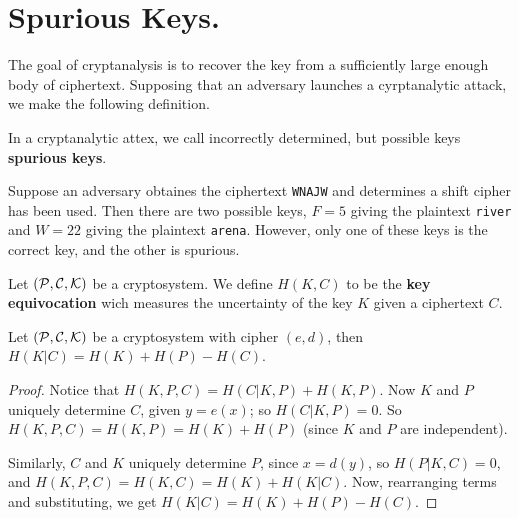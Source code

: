
\section{Spurious Keys.}
\label{section1}

The goal of cryptanalysis is to recover the key from a sufficiently large enough
body of ciphertext. Supposing that an adversary launches a cyrptanalytic attack,
we make the following definition.

\begin{definition}
    In a cryptanalytic attex, we call incorrectly determined, but possible keys
     \textbf{spurious keys}.
\end{definition}

\begin{example}
    Suppose an adversary obtaines the ciphertext \lstinline{WNAJW} and
    determines a shift cipher has been used. Then there are two possible keys,
    $F=5$ giving the plaintext \lstinline {river} and $W=22$ giving the
    plaintext \lstinline{arena}. However, only one of these keys is the correct
    key, and the other is spurious.
\end{example}

\begin{definition}
    Let $(\mathcal{P},\mathcal{C},\mathcal{K})$ be a cryptosystem. We define $H(K,C)$ to be the
    \textbf{key equivocation} wich measures the uncertainty of the key $K$ given
    a ciphertext $C$.
\end{definition}

\begin{theorem}\label{2.3.1}
    Let $(\mathcal{P},\mathcal{C},\mathcal{K})$ be a cryptosystem with cipher $(e,d)$, then
    $H(K|C)=H(K)+H(P)-H(C)$.
\end{theorem}
\begin{proof}
    Notice that $H(K,P,C)=H(C|K,P)+H(K,P)$. Now $K$ and $P$ uniquely determine
    $C$, given $y=e(x)$; so $H(C|K,P)=0$. So $H(K,P,C)=H(K,P)=H(K)+H(P)$ (since
    $K$ and  $P$ are independent).

    Similarly, $C$ and $K$ uniquely determine  $P$, since  $x=d(y)$, so
    $H(P|K,C)=0$, and $H(K,P,C)=H(K,C)=H(K)+H(K|C)$. Now, rearranging terms and
    substituting, we get $H(K|C)=H(K)+H(P)-H(C)$.
\end{proof}

